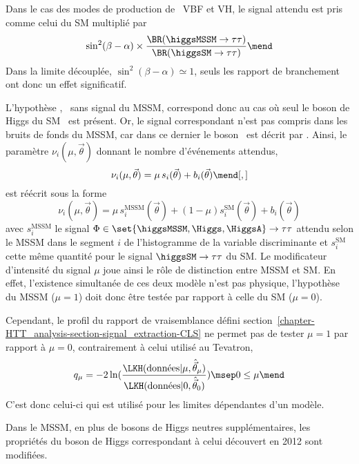 Dans le cas des modes de production de \higgsMSSM\ VBF et VH,
le signal attendu est pris comme celui du SM multiplié par
\begin{equation}
\sin^2(\beta-\alpha) \times \frac{\BR(\higgsMSSM\to\tau\tau)}{\BR(\higgsSM\to\tau\tau)}
\mend
\end{equation}
Dans la limite découplée, $\sin^2(\beta-\alpha)\simeq1$, seuls les rapport de branchement ont donc un effet significatif.
\par
L'hypothèse \hypB, \ie\ sans signal du MSSM, correspond donc au cas où seul le boson de Higgs du SM \higgsSM\ est présent.
Or, le signal correspondant n'est pas compris dans les bruits de fonds du MSSM, car dans ce dernier le boson \higgs\ est décrit par \higgsMSSM.
Ainsi, le paramètre $\nu_i(\mu,\vec{\theta})$ donnant le nombre d'événements attendus,
\begin{equation}
\nu_i(\mu,\vec{\theta}) = \mu \, s_i(\vec{\theta}) + b_i(\vec{\theta}) \mend[,]
\end{equation}
est réécrit sous la forme
\begin{equation}
\nu_i(\mu,\vec{\theta}) = \mu \, s_i^\text{MSSM}(\vec{\theta}) + (1-\mu)s_i^\text{SM}(\vec{\theta}) + b_i(\vec{\theta})
\end{equation}
avec
$s_i^\text{MSSM}$ le signal $\Phi\in\set{\higgsMSSM,\Higgs,\HiggsA}\to\tau\tau$ attendu selon le MSSM
dans le segment $i$ de l'histogramme de la variable discriminante
et
$s_i^\text{SM}$ cette même quantité pour le signal $\higgsSM\to\tau\tau$ du SM.
Le modificateur d'intensité du signal $\mu$ joue ainsi le rôle de distinction entre MSSM et SM.
En effet, l'existence simultanée de ces deux modèle n'est pas physique,
l'hypothèse du MSSM ($\mu=1$) doit donc être testée par rapport à celle du SM ($\mu=0$).
\par
Cependant, le profil du rapport de vraisemblance défini section~\ref{chapter-HTT_analysis-section-signal_extraction-CLS}
ne permet pas de tester $\mu=1$ par rapport à $\mu=0$,
contrairement à celui utilisé au Tevatron,
\begin{equation}
q_{\mu} = -2 \ln(\frac{\LKH(\text{données} |  \mu, \hat{\vec{\theta}}_{\mu})}{\LKH(\text{données} |  0, \hat{\vec{\theta}}_{0})})
\msep
0 \leq \mu
\mend
\end{equation}
C'est donc celui-ci qui est utilisé pour les limites dépendantes d'un modèle.
\par
Dans le MSSM, en plus de bosons de Higgs neutres supplémentaires, les propriétés du boson de Higgs correspondant à celui découvert en 2012 sont modifiées.
